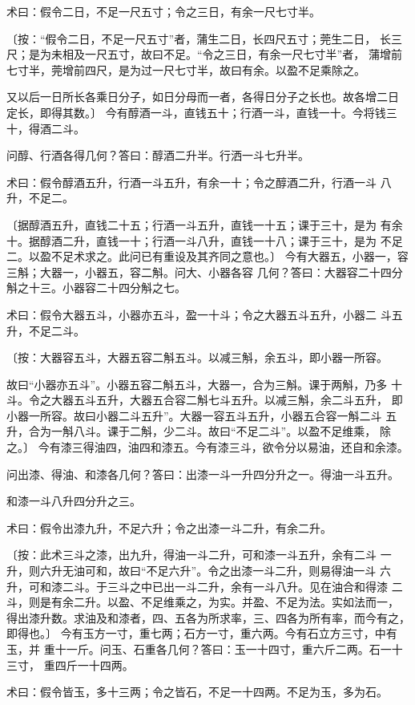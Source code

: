 \documentclass[12pt,UTF8]{ctexbook}
\begin{document}
术曰：假令二日，不足一尺五寸；令之三日，有余一尺七寸半。

〔按：“假令二日，不足一尺五寸”者，蒲生二日，长四尺五寸；莞生二日， 长三尺；是为未相及一尺五寸，故曰不足。“令之三日，有余一尺七寸半”者， 蒲增前七寸半，莞增前四尺，是为过一尺七寸半，故曰有余。以盈不足乘除之。

又以后一日所长各乘日分子，如日分母而一者，各得日分子之长也。故各增二日 定长，即得其数。〕 今有醇酒一斗，直钱五十；行酒一斗，直钱一十。今将钱三十，得酒二斗。

问醇、行酒各得几何？答曰：醇酒二升半。行洒一斗七升半。

术曰：假令醇酒五升，行酒一斗五升，有余一十；令之醇酒二升，行酒一斗 八升，不足二。

〔据醇酒五升，直钱二十五；行酒一斗五升，直钱一十五；课于三十，是为 有余十。据醇酒二升，直钱一十；行酒一斗八升，直钱一十八；课于三十，是为 不足二。以盈不足术求之。此问已有重设及其齐同之意也。〕 今有大器五，小器一，容三斛；大器一，小器五，容二斛。问大、小器各容 几何？答曰：大器容二十四分斛之十三。小器容二十四分斛之七。

术曰：假令大器五斗，小器亦五斗，盈一十斗；令之大器五斗五升，小器二 斗五升，不足二斗。

〔按：大器容五斗，大器五容二斛五斗。以减三斛，余五斗，即小器一所容。

故曰“小器亦五斗”。小器五容二斛五斗，大器一，合为三斛。课于两斛，乃多 十斗。令之大器五斗五升，大器五合容二斛七斗五升。以减三斛，余二斗五升， 即小器一所容。故曰小器二斗五升”。大器一容五斗五升，小器五合容一斛二斗 五升，合为一斛八斗。课于二斛，少二斗。故曰“不足二斗”。以盈不足维乘， 除之。〕 今有漆三得油四，油四和漆五。今有漆三斗，欲令分以易油，还自和余漆。

问出漆、得油、和漆各几何？答曰：出漆一斗一升四分升之一。得油一斗五升。

和漆一斗八升四分升之三。

术曰：假令出漆九升，不足六升；令之出漆一斗二升，有余二升。

〔按：此术三斗之漆，出九升，得油一斗二升，可和漆一斗五升，余有二斗 一升，则六升无油可和，故曰“不足六升”。令之出漆一斗二升，则易得油一斗 六升，可和漆二斗。于三斗之中已出一斗二升，余有一斗八升。见在油合和得漆 二斗，则是有余二升。以盈、不足维乘之，为实。并盈、不足为法。实如法而一， 得出漆升数。求油及和漆者，四、五各为所求率，三、四各为所有率，而今有之， 即得也。〕 今有玉方一寸，重七两；石方一寸，重六两。今有石立方三寸，中有玉，并 重十一斤。问玉、石重各几何？答曰：玉一十四寸，重六斤二两。石一十三寸， 重四斤一十四两。

术曰：假令皆玉，多十三两；令之皆石，不足一十四两。不足为玉，多为石。
\end{document}
